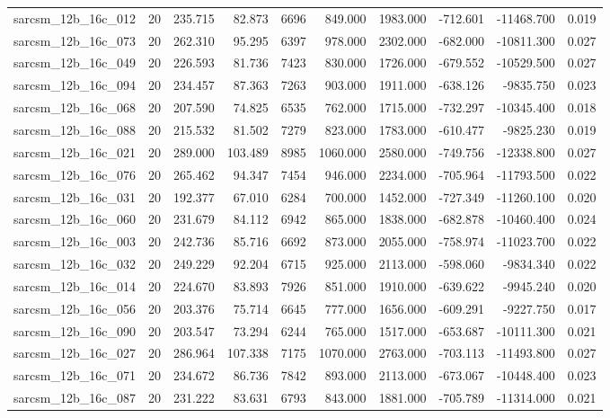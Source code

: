 \begin{tabular}{lrrrrrrrrr}
sarcsm\_12b\_16c\_012 & 20 & 235.715 & 82.873 & 6696 & 849.000 & 1983.000 & -712.601 & -11468.700 & 0.019 \\
sarcsm\_12b\_16c\_073 & 20 & 262.310 & 95.295 & 6397 & 978.000 & 2302.000 & -682.000 & -10811.300 & 0.027 \\
sarcsm\_12b\_16c\_049 & 20 & 226.593 & 81.736 & 7423 & 830.000 & 1726.000 & -679.552 & -10529.500 & 0.027 \\
sarcsm\_12b\_16c\_094 & 20 & 234.457 & 87.363 & 7263 & 903.000 & 1911.000 & -638.126 & -9835.750 & 0.023 \\
sarcsm\_12b\_16c\_068 & 20 & 207.590 & 74.825 & 6535 & 762.000 & 1715.000 & -732.297 & -10345.400 & 0.018 \\
sarcsm\_12b\_16c\_088 & 20 & 215.532 & 81.502 & 7279 & 823.000 & 1783.000 & -610.477 & -9825.230 & 0.019 \\
sarcsm\_12b\_16c\_021 & 20 & 289.000 & 103.489 & 8985 & 1060.000 & 2580.000 & -749.756 & -12338.800 & 0.027 \\
sarcsm\_12b\_16c\_076 & 20 & 265.462 & 94.347 & 7454 & 946.000 & 2234.000 & -705.964 & -11793.500 & 0.022 \\
sarcsm\_12b\_16c\_031 & 20 & 192.377 & 67.010 & 6284 & 700.000 & 1452.000 & -727.349 & -11260.100 & 0.020 \\
sarcsm\_12b\_16c\_060 & 20 & 231.679 & 84.112 & 6942 & 865.000 & 1838.000 & -682.878 & -10460.400 & 0.024 \\
sarcsm\_12b\_16c\_003 & 20 & 242.736 & 85.716 & 6692 & 873.000 & 2055.000 & -758.974 & -11023.700 & 0.022 \\
sarcsm\_12b\_16c\_032 & 20 & 249.229 & 92.204 & 6715 & 925.000 & 2113.000 & -598.060 & -9834.340 & 0.022 \\
sarcsm\_12b\_16c\_014 & 20 & 224.670 & 83.893 & 7926 & 851.000 & 1910.000 & -639.622 & -9945.240 & 0.020 \\
sarcsm\_12b\_16c\_056 & 20 & 203.376 & 75.714 & 6645 & 777.000 & 1656.000 & -609.291 & -9227.750 & 0.017 \\
sarcsm\_12b\_16c\_090 & 20 & 203.547 & 73.294 & 6244 & 765.000 & 1517.000 & -653.687 & -10111.300 & 0.021 \\
sarcsm\_12b\_16c\_027 & 20 & 286.964 & 107.338 & 7175 & 1070.000 & 2763.000 & -703.113 & -11493.800 & 0.027 \\
sarcsm\_12b\_16c\_071 & 20 & 234.672 & 86.736 & 7842 & 893.000 & 2113.000 & -673.067 & -10448.400 & 0.023 \\
sarcsm\_12b\_16c\_087 & 20 & 231.222 & 83.631 & 6793 & 843.000 & 1881.000 & -705.789 & -11314.000 & 0.021 \\

\end{tabular}
